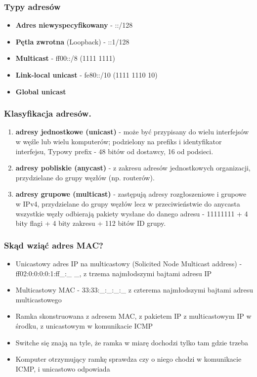 \documentclass[main.tex]{subfiles}
\begin{document}
    \subsubsection{Typy adresów}
    \begin{itemize}
        \item \textbf{Adres niewyspecyfikowany} - ::/128
        \item \textbf{Pętla zwrotna} (Loopback) - ::1/128
        \item \textbf{Multicast} - ff00::/8 (1111 1111)
        \item \textbf{Link-local unicast} - fe80::/10 (1111 1110 10)
        \item \textbf{Global unicast}
    \end{itemize}

    \subsubsection{Klasyfikacja adresów.}
    \begin{enumerate}
        \item \textbf{adresy jednostkowe (unicast)} - może być przypisany do wielu interfejsów w węźle lub wielu komputerów;
        podzielony na prefiks i identyfikator interfejsu, Typowy prefix - 48 bitów od dostawcy, 16 od podsieci.
        \item \textbf{adresy pobliskie (anycast)} - z zakresu adresów jednostkowych organizacji, przydzielane do grupy
        węzłów (np. routerów).
        \item \textbf{adresy grupowe (multicast)} - zastępują adresy rozgłoszeniowe i grupowe w IPv4, przydzielane do
        grupy węzłów lecz w przeciwieństwie do anycasta wszystkie węzły odbierają pakiety wysłane do danego adresu
        - 11111111 + 4 bity flagi + 4 bity zakresu + 112 bitów ID grupy.
    \end{enumerate}

    \subsubsection{Skąd wziąć adres MAC?}
    \begin{itemize}
        \item Unicastowy adres IP na multicastowy (Solicited Node Multicast address) - ff02:0:0:0:0:1:ff\_:\_ \_,
        z trzema najmłodszymi bajtami adresu IP
        \item Multicastowy MAC - 33:33:\_:\_:\_:\_ z czterema najmłodszymi bajtami adresu multicastowego
        \item Ramka skonstruowana z adresem MAC, z pakietem IP z multicastowym IP w środku, z unicastowym w komunikacie ICMP
        \item Switche się znają na tyle, że ramka w miarę dochodzi tylko tam gdzie trzeba
        \item Komputer otrzymujący ramkę sprawdza czy o niego chodzi w komunikacie ICMP, i unicastowo odpowiada
    \end{itemize}
    \newpage
\end{document}
